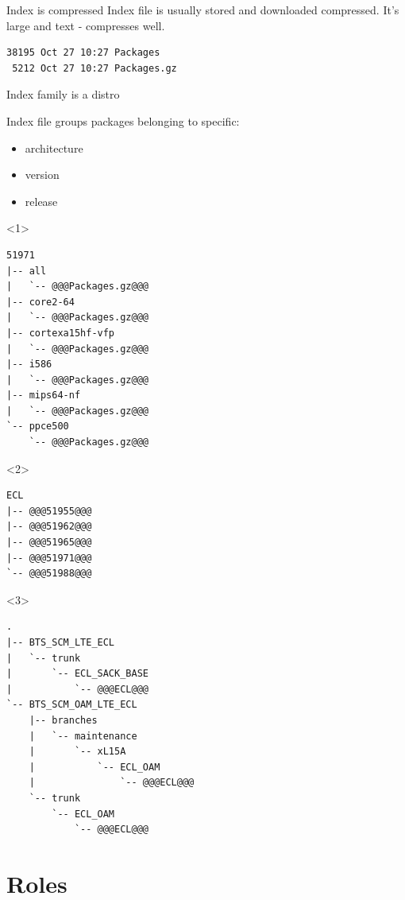 \documentclass{beamer}
\begin{document}
\begin{frame}[fragile]{Index is compressed}
Index file is usually stored and downloaded compressed.
It's large and text - compresses well.
\begin{lstlisting}[style=Console]
38195 Oct 27 10:27 Packages
 5212 Oct 27 10:27 Packages.gz
\end{lstlisting}
\end{frame}

\begin{frame}[fragile, t]{Index family is a distro}
    \begin{block}{}
        Index file groups packages belonging to specific:
        \begin{itemize}
            \item<1-> architecture
            \item<2-> version
            \item<3-> release
        \end{itemize}
    \end{block}
\begin{onlyenv}<1>\begin{lstlisting}[style=TinyConsole]
51971
|-- all
|   `-- @@@Packages.gz@@@
|-- core2-64
|   `-- @@@Packages.gz@@@
|-- cortexa15hf-vfp
|   `-- @@@Packages.gz@@@
|-- i586
|   `-- @@@Packages.gz@@@
|-- mips64-nf
|   `-- @@@Packages.gz@@@
`-- ppce500
    `-- @@@Packages.gz@@@
\end{lstlisting}\end{onlyenv}
\begin{onlyenv}<2>\begin{lstlisting}[style=TinyConsole]
ECL
|-- @@@51955@@@
|-- @@@51962@@@
|-- @@@51965@@@
|-- @@@51971@@@
`-- @@@51988@@@
\end{lstlisting}\end{onlyenv}
\begin{onlyenv}<3>\begin{lstlisting}[style=TinyConsole]
.
|-- BTS_SCM_LTE_ECL
|   `-- trunk
|       `-- ECL_SACK_BASE
|           `-- @@@ECL@@@
`-- BTS_SCM_OAM_LTE_ECL
    |-- branches
    |   `-- maintenance
    |       `-- xL15A
    |           `-- ECL_OAM
    |               `-- @@@ECL@@@
    `-- trunk
        `-- ECL_OAM
            `-- @@@ECL@@@
\end{lstlisting}\end{onlyenv}
\end{frame}

\section{Roles}
\end{document}
